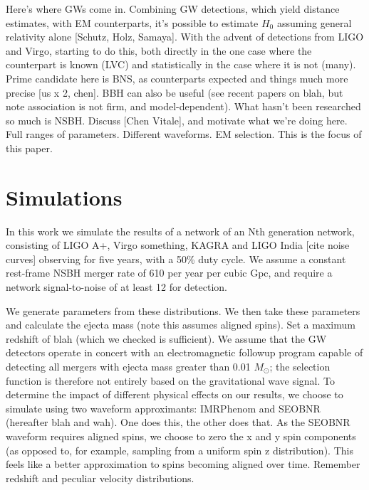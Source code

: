 \documentclass[twocolumn]{aastex63}
\begin{document}
Here's where GWs come in. Combining GW detections, which yield distance estimates, with EM counterparts, it's possible to estimate $H_0$ assuming general relativity alone [Schutz, Holz, Samaya]. With the advent of detections from LIGO and Virgo, starting to do this, both directly in the one case where the counterpart is known (LVC) and statistically in the case where it is not (many). Prime candidate here is BNS, as counterparts expected and things much more precise [us x 2, chen]. BBH can also be useful (see recent papers on blah, but note association is not firm, and model-dependent). What hasn't been researched so much is NSBH. Discuss [Chen Vitale], and motivate what we're doing here. Full ranges of parameters. Different waveforms. EM selection. This is the focus of this paper.


\section{Simulations} \label{sec:sims}

In this work we simulate the results of a network of an Nth generation network, consisting of LIGO A+, Virgo something, KAGRA and LIGO India [cite noise curves] observing for five years, with a 50\% duty cycle. We assume a constant rest-frame  NSBH merger rate of 610 per year per cubic Gpc, and require a network signal-to-noise of at least 12 for detection.

We generate parameters from these distributions. We then take these parameters and calculate the ejecta mass (note this assumes aligned spins). Set a maximum redshift of blah (which we checked is sufficient). We assume that the GW detectors operate in concert with an electromagnetic followup program capable of detecting all mergers with ejecta mass greater than 0.01 $M_\odot$; the selection function is therefore not entirely based on the gravitational wave signal. To determine the impact of different physical effects on our results, we choose to simulate using two waveform approximants: IMRPhenom and SEOBNR (hereafter blah and wah). One does this, the other does that. As the SEOBNR waveform requires aligned spins, we choose to zero the x and y spin components (as opposed to, for example, sampling from a uniform spin z distribution). This feels like a better approximation to spins becoming aligned over time. Remember redshift and peculiar velocity distributions.
\end{document}
